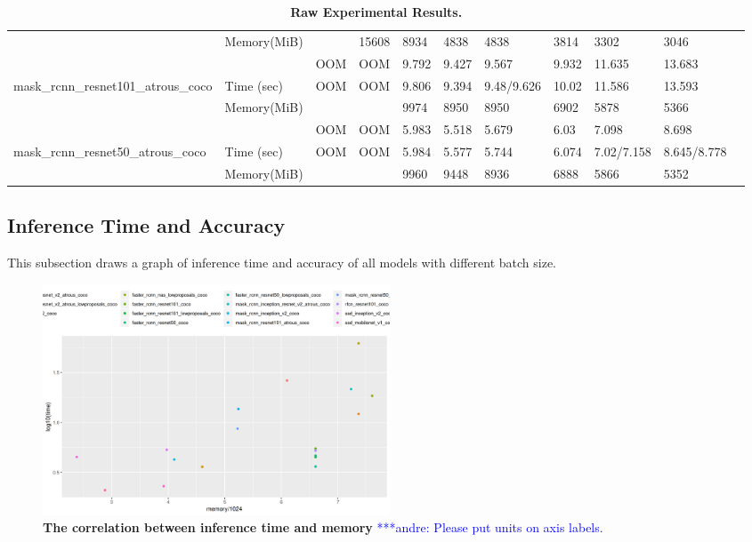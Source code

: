 \documentclass[conference]{IEEEtran}
\newcommand{\alnote}[1]{ {\textcolor{blue} { ***andre: #1 }}}
\newcommand{\alnote}[1]{}
\begin{document}
\begin{table}[]
{\begin{tabular}{lllllllllll}
                                                                & Memory(MiB)   &                     & 15608              & 8934              & 4838              & 4838             & 3814   & 3302              & 3046        &          \\
                                                                &               & OOM                 & OOM                & 9.792             & 9.427             & 9.567            & 9.932  & 11.635            & 13.683      &          \\
mask\_rcnn\_resnet101\_atrous\_coco                             & Time (sec)    & OOM                 & OOM                & 9.806             & 9.394             & 9.48/9.626       & 10.02  & 11.586            & 13.593      &          \\
                                                                & Memory(MiB)   &                     &                    & 9974              & 8950              & 8950             & 6902   & 5878              & 5366        &          \\
                                                                &               & OOM                 & OOM                & 5.983             & 5.518             & 5.679            & 6.03   & 7.098             & 8.698       &          \\
mask\_rcnn\_resnet50\_atrous\_coco                              & Time (sec)    & OOM                 & OOM                & 5.984             & 5.577             & 5.744            & 6.074  & 7.02/7.158        & 8.645/8.778 &          \\
                                                                & Memory(MiB)   &                     &                    & 9960              & 9448              & 8936             & 6888   & 5866              & 5352        &         
\end{tabular}%
}
\caption{\textbf{Raw Experimental Results.}}
\label{table:raw-results}
\end{table}

\subsection{Inference Time and Accuracy}
This subsection draws a graph of inference time and accuracy of all models with different batch size.

\begin{figure}[htpb]
	  \centering
	  \includegraphics[width=0.5\textwidth]{MemoryVSRunning}
	  \caption{\textbf{The correlation between inference time and memory}\alnote{Please put units on axis labels.}}
	  \label{fig:memory-running}
\end{figure}
\end{document}
